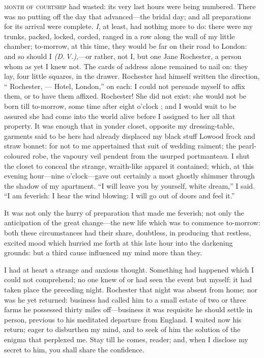 
 \textsc{month of courtship} had wasted: its very last hours were being
numbered.  There was no putting off the day that advanced---the bridal
day; and all preparations for its arrival were complete.  \emph{I}, at
least, had nothing more to do: there were my trunks, packed, locked,
corded, ranged in a row along the wall of my little chamber; to-morrow,
at this time, they would be far on their road to London: and so should I
\emph{(D.\,V.),}---or rather, not I, but one Jane Rochester, a person whom as yet
I knew not.  The cards of address alone remained to nail on: they lay,
four little squares, in the drawer.  \Mr{} Rochester had himself written
the direction, \enquote{\Mrs{} Rochester, --- Hotel, London,} on each: I
could not persuade myself to affix them, or to have them affixed.  \Mrs{}
Rochester!  She did not exist: she would not be born till to-morrow,
some time after eight o'clock \AM; and I would wait to be assured she
had come into the world alive before I assigned to her all that
property.  It was enough that in yonder closet, opposite my
dressing-table, garments said to be hers had already displaced my black
stuff Lowood frock and straw bonnet: for not to me appertained that suit
of wedding raiment; the pearl-coloured robe, the vapoury veil pendent
from the usurped portmanteau.  I shut the closet to conceal the strange,
wraith-like apparel it contained; which, at this evening hour---nine
o'clock---gave out certainly a most ghostly shimmer through the shadow
of my apartment.  \enquote{I will leave you by yourself, white dream,} I
said.  \enquote{I am feverish: I hear the wind blowing: I will go out of
	doors and feel it.}

It was not only the hurry of preparation that made me feverish; not only
the anticipation of the great change---the new life which was to
commence to-morrow: both these circumstances had their share, doubtless,
in producing that restless, excited mood which hurried me forth at this
late hour into the darkening grounds: but a third cause influenced my
mind more than they.

I had at heart a strange and anxious thought.  Something had happened
which I could not comprehend; no one knew of or had seen the event but
myself: it had taken place the preceding night.  \Mr{} Rochester that
night was absent from home; nor was he yet returned: business had called
him to a small estate of two or three farms he possessed thirty miles
off---business it was requisite he should settle in person, previous to
his meditated departure from England.  I waited now his return; eager to
disburthen my mind, and to seek of him the solution of the enigma that
perplexed me.  Stay till he comes, reader; and, when I disclose my
secret to him, you shall share the confidence.

